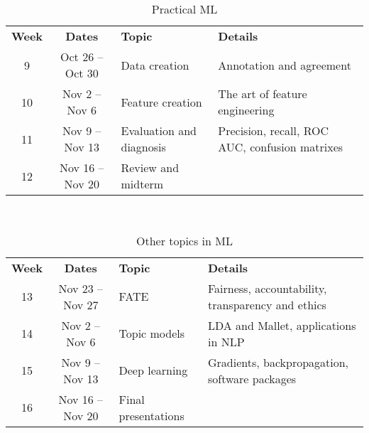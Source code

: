\documentclass[10pt]{memoir}
\begin{document}
\begin{table}[htb!]
\centering
\begin{tabular}{ccll}
     \textbf{Week} & \textbf{Dates} & \textbf{Topic} & \textbf{Details}   \\
    \cmidrule[.1em](lr){1-4}
    
     9 & Oct 26 -- Oct 30 & Data creation &  Annotation and agreement \\
    \cmidrule[.1em](lr){1-4} 
 
     10 & Nov 2 -- Nov 6 & Feature creation &  The art of feature engineering \\
    \cmidrule[.1em](lr){1-4} 

     11 & Nov 9 -- Nov 13 & Evaluation and diagnosis &  Precision, recall, ROC AUC, confusion matrixes \\
    \cmidrule[.1em](lr){1-4} 

     12 & Nov 16 -- Nov 20 & Review and midterm &   \\
    \cmidrule[.1em](lr){1-4} 

\end{tabular}\\
\caption{Practical ML}
\end{table}

\begin{table}[htb!]
\centering
\begin{tabular}{ccll}
     \textbf{Week} & \textbf{Dates} & \textbf{Topic} & \textbf{Details}   \\
    \cmidrule[.1em](lr){1-4}
    
     13  & Nov 23 -- Nov 27 & FATE &   Fairness, accountability, transparency and ethics \\
    \cmidrule[.1em](lr){1-4} 
 
     14 & Nov 2 -- Nov 6 & Topic models &  LDA and Mallet, applications in NLP \\
    \cmidrule[.1em](lr){1-4} 

     15 & Nov 9 -- Nov 13 & Deep learning &  Gradients, backpropagation, software packages \\
    \cmidrule[.1em](lr){1-4} 

     16  & Nov 16 -- Nov 20 & Final presentations &   \\
    \cmidrule[.1em](lr){1-4} 
    

\end{tabular}\\
\caption{Other topics in ML}
\end{table}
\end{document}
